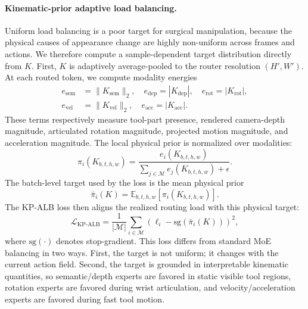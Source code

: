 \paragraph{Kinematic-prior adaptive load balancing.}
Uniform load balancing is a poor target for surgical manipulation, because the physical causes of appearance change are highly non-uniform across frames and actions. We therefore compute a sample-dependent target distribution directly from $K$. First, $K$ is adaptively average-pooled to the router resolution $(H',W')$. At each routed token, we compute modality energies
\[
\begin{aligned}
    e_{\mathrm{sem}} &= \|K_{\mathrm{sem}}\|_2,\quad
    e_{\mathrm{dep}} = |K_{\mathrm{dep}}|,\quad
    e_{\mathrm{rot}} = |K_{\mathrm{rot}}|,\\
    e_{\mathrm{vel}} &= \|K_{\mathrm{vel}}\|_2,\quad
    e_{\mathrm{acc}} = |K_{\mathrm{acc}}|.
\end{aligned}
\]
These terms respectively measure tool-part presence, rendered camera-depth magnitude, articulated rotation magnitude, projected motion magnitude, and acceleration magnitude. The local physical prior is normalized over modalities:
\[
    \pi_i(K_{b,t,h,w})=
    \frac{e_i(K_{b,t,h,w})}{\sum_{j\in\mathcal{M}} e_j(K_{b,t,h,w})+\epsilon}.
\]
The batch-level target used by the loss is the mean physical prior
\[
    \bar{\pi}_i(K)=\mathbb{E}_{b,t,h,w}\left[\pi_i(K_{b,t,h,w})\right].
\]
The KP-ALB loss then aligns the realized routing load with this physical target:
\[
    \mathcal{L}_{\mathrm{KP\mbox{-}ALB}}
    =
    \frac{1}{|\mathcal{M}|}
    \sum_{i\in\mathcal{M}}
    \left(\ell_i-\mathrm{sg}\!\left(\bar{\pi}_i(K)\right)\right)^2 ,
\]
where $\mathrm{sg}(\cdot)$ denotes stop-gradient. This loss differs from standard MoE balancing in two ways. First, the target is not uniform; it changes with the current action field. Second, the target is grounded in interpretable kinematic quantities, so semantic/depth experts are favored in static visible tool regions, rotation experts are favored during wrist articulation, and velocity/acceleration experts are favored during fast tool motion.

